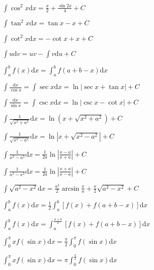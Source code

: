 \begin{multicols}{2}
\begin{spacing}{\hangju}
        \noindent $\displaystyle \int{\cos^2{x}}\mathrm{d}x = \frac{x}{2} + \frac{\sin{2x}}{4} + C$

        \noindent $\displaystyle \int{\tan^2{x}}\mathrm{d}x = \tan{x} - x + C$

        \noindent $\displaystyle \int{\cot^2{x}}\mathrm{d}x = - \cot{x} + x + C$

        \noindent $\displaystyle \int{u}\mathrm{d}v = uv - \int{v}\mathrm{d}u + C$

        \noindent $\displaystyle \int_{a}^{b}{f(x)}\mathrm{d}x = \int_{a}^{b}{f(a + b - x)}\mathrm{d}x$
    \end{spacing}
\end{multicols}

\begin{spacing}{\hangju}
    \noindent $\displaystyle \int{\frac{\mathrm{d}x}{\cos{x}}} = \int{\sec{x}}\mathrm{d}x = \ln{\left| \sec{x} + \tan{x} \right| } + C$

    \noindent $\displaystyle \int{\frac{\mathrm{d}x}{\sin{x}}} = \int{\csc{x}}\mathrm{d}x = \ln{\left| \csc{x} - \cot{x} \right| } + C$

    \noindent $\displaystyle \int{\frac{1}{\sqrt{x^2 + a^2}}}\mathrm{d}x = \ln{(x + \sqrt{x^2 + a ^2})} + C$

    \noindent $\displaystyle \int{\frac{1}{\sqrt{x^2 - a^2}}}\mathrm{d}x = \ln{\left|x + \sqrt{x^2 - a ^2}\right|} + C$

    \noindent $\displaystyle \int{\frac{1}{x^2 - a^2}} \mathrm{d}x = \frac{1}{2a} \ln{\left| \frac{x - a}{x + a} \right|} + C$

    \noindent $\displaystyle \int{\frac{1}{a^2 - x^2}} \mathrm{d}x = \frac{1}{2a} \ln{\left| \frac{x + a}{x - a} \right|} + C$

    \noindent $\displaystyle \int{\sqrt{a^2 - x^2}}\mathrm{d}x = \frac{a^2}{2}\arcsin{\frac{x}{a}} + \frac{x}{2}\sqrt{a^2 - x^2} + C$

    \noindent $\displaystyle \int_{a}^{b}{f(x)}\mathrm{d}x = \frac{1}{2}\int_{a}^{b}{[f(x) + f(a + b - x)]}\mathrm{d}x$

    \noindent $\displaystyle \int_{a}^{b}{f(x)}\mathrm{d}x = \int_{a}^{\frac{a+b}{2}}{[f(x) + f(a + b - x)]}\mathrm{d}x$

    \noindent $\displaystyle \int_{0}^{\pi}{xf(\sin{x})}\mathrm{d}x = \frac{\pi}{2}\int_{0}^{\pi}{f(\sin{x})}\mathrm{d}x$

    \noindent $\displaystyle \int_{0}^{\pi}{xf(\sin{x})}\mathrm{d}x = \pi\int_{0}^{\frac{\pi}{2}}{f(\sin{x})}\mathrm{d}x$


\end{spacing}
